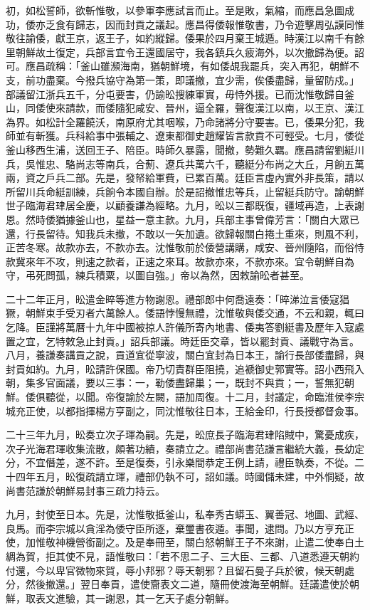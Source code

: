 \begin{pinyinscope}
初，如松誓師，欲斬惟敬，以參軍李應試言而止。至是敗，氣縮，而應昌急圖成功，倭亦乏食有歸志，因而封貢之議起。應昌得倭報惟敬書，乃令遊擊周弘謨同惟敬往諭倭，獻王京，返王子，如約縱歸。倭果於四月棄王城遁。時漢江以南千有餘里朝鮮故土復定，兵部言宜令王還國居守，我各鎮兵久疲海外，以次撤歸為便。詔可。應昌疏稱：「釜山雖瀕海南，猶朝鮮境，有如倭覘我罷兵，突入再犯，朝鮮不支，前功盡棄。今撥兵協守為第一策，即議撤，宜少需，俟倭盡歸，量留防戍。」部議留江浙兵五千，分屯要害，仍諭昖搜練軍實，毋恃外援。已而沈惟敬歸自釜山，同倭使來請款，而倭隨犯咸安、晉州，逼全羅，聲復漢江以南，以王京、漢江為界。如松計全羅饒沃，南原府尤其咽喉，乃命諸將分守要害。已，倭果分犯，我師並有斬獲。兵科給事中張輔之、遼東都御史趙耀皆言款貢不可輕受。七月，倭從釜山移西生浦，送回王子、陪臣。時師久暴露，聞撤，勢難久羈。應昌請留劉綎川兵，吳惟忠、駱尚志等南兵，合薊、遼兵共萬六千，聽綎分布尚之大丘，月餉五萬兩，資之戶兵二部。先是，發帑給軍費，已累百萬。廷臣言虛內實外非長策，請以所留川兵命綎訓練，兵餉令本國自辦。於是詔撤惟忠等兵，止留綎兵防守。諭朝鮮世子臨海君珒居全慶，以顧養謙為經略。九月，昖以三都既復，疆域再造，上表謝恩。然時倭猶據釜山也，星益一意主款。九月，兵部主事曾偉芳言：「關白大眾已還，行長留待。知我兵未撤，不敢以一矢加遺。欲歸報關白捲土重來，則風不利，正苦冬寒。故款亦去，不款亦去。沈惟敬前於倭營講購，咸安、晉州隨陷，而俗恃款冀來年不攻，則速之款者，正速之來耳。故款亦來，不款亦來。宜令朝鮮自為守，弔死問孤，練兵積粟，以圖自強。」帝以為然，因敕諭昖者甚至。

二十二年正月，昖遣金晬等進方物謝恩。禮部郎中何喬遠奏：「晬涕泣言倭寇猖獗，朝鮮束手受刃者六萬餘人。倭語悖慢無禮，沈惟敬與倭交通，不云和親，輒曰乞降。臣謹將萬曆十九年中國被掠人許儀所寄內地書、倭夷答劉綎書及歷年入寇處置之宜，乞特敕急止封貢。」詔兵部議。時廷臣交章，皆以罷封貢、議戰守為言。八月，養謙奏講貢之說，貢道宜從寧波，關白宜封為日本王，諭行長部倭盡歸，與封貢如約。九月，昖請許保國。帝乃切責群臣阻撓，追褫御史郭實等。詔小西飛入朝，集多官面議，要以三事：一，勒倭盡歸巢；一，既封不與貢；一，誓無犯朝鮮。倭俱聽從，以聞。帝復諭於左闕，語加周復。十二月，封議定，命臨淮侯李宗城充正使，以都指揮楊方亨副之，同沈惟敬往日本，王給金印，行長授都督僉事。

二十三年九月，昖奏立次子琿為嗣。先是，昖庶長子臨海君珒陷賊中，驚憂成疾，次子光海君琿收集流散，頗著功績，奏請立之。禮部尚書范謙言繼統大義，長幼定分，不宜僭差，遂不許。至是復奏，引永樂間恭定王例上請，禮臣執奏，不從。二十四年五月，昖復疏請立琿，禮部仍執不可，詔如議。時國儲未建，中外恫疑，故尚書范謙於朝鮮易封事三疏力持云。

九月，封使至日本。先是，沈惟敬抵釜山，私奉秀吉蟒玉、翼善冠、地圖、武經、良馬。而李宗城以貪淫為倭守臣所逐，棄璽書夜遁。事聞，逮問。乃以方亨充正使，加惟敬神機營銜副之。及是奉冊至，關白怒朝鮮王子不來謝，止遣二使奉白土綢為賀，拒其使不見，語惟敬曰：「若不思二子、三大臣、三都、八道悉遵天朝約付還，今以卑官微物來賀，辱小邦邪？辱天朝邪？且留石曼子兵於彼，候天朝處分，然後撤還。」翌日奉貢，遣使齎表文二道，隨冊使渡海至朝鮮。廷議遣使於朝鮮，取表文進驗，其一謝恩，其一乞天子處分朝鮮。


\end{pinyinscope}
